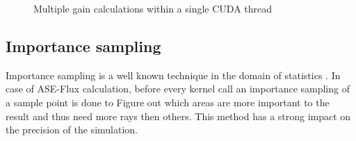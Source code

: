 \begin{figure}[H]
  \centerline
  {}
  \caption{Multiple gain calculations within a single CUDA thread}
  \label{graphic:thread_detail}
\end{figure}

\subsection{Importance sampling}
\label{subsec:importance_sampling}
Importance sampling is a well known technique in the domain
of statistics \cite{importanceSamplingSource}. In case of 
ASE-Flux calculation, before every kernel call an importance sampling 
of a sample point is done to Figure out which areas are more
important to the result and thus need more rays then others.
This method has a strong impact on the precision of the simulation.


